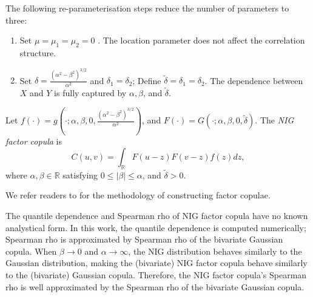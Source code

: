 The following re-parameterisation steps reduce the number of parameters to three:
\begin{enumerate}
  \item Set $\mu = \mu_1= \mu_2 = 0$ . The location parameter does not affect the correlation structure.
  \item Set $\delta = \frac{(\alpha^2-\beta^2)^{3/2}}{\alpha^2}$ and $\delta_1 = \delta_2$; Define $\tilde \delta = \delta_1 = \delta_2$. 
  The dependence between $X$ and $Y$ is fully captured by $\alpha, \beta$, and $\tilde \delta$.  
\end{enumerate}


\begin{prop}
  Let $f(\cdot) = g\left(\cdot; \alpha, \beta, 0, \frac{(\alpha^2-\beta^2)^{3/2}}{\alpha^2}
  \right)$, and $F (\cdot) = G(\cdot; \alpha, \beta, 0, \tilde
  \delta)$. The {\em NIG factor copula} is 
  \begin{equation*}
    C(u,v) = \int_\mathbb{R} F(u-z)F(v-z)f(z)dz,
  \end{equation*}
  where $\alpha, \beta \in \mathbb{R}$ satisfying $0 \leq |\beta| \leq
  \alpha$, and $\tilde \delta >0 $. 
\end{prop}

We refer readers to \cite{krupskii2013factor} for the methodology of constructing factor copulae. 

The quantile dependence and Spearman rho of NIG factor copula have no known analystical form.
In this work, the quantile dependence is computed numerically; 
Spearman rho is approximated by Spearman rho of the bivariate Gaussian copula. 
When $\beta \rightarrow 0$ and $\alpha \rightarrow \infty$, the NIG
distribution behaves similarly to the Gaussian distribution, 
making the (bivariate) NIG factor copula behave similarly to the
(bivariate) Gaussian copula. 
Therefore, the NIG factor copula's Spearman rho is well approximated by the Spearman rho of the bivariate Gaussian copula.


